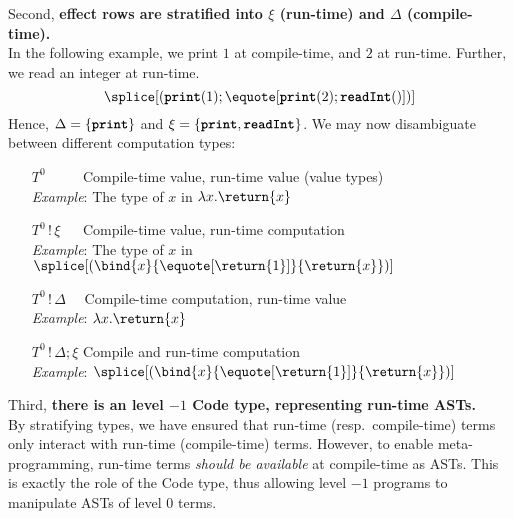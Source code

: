   Second, \textbf{effect rows are stratified into $\xi$ (run-time) and $\Delta$ (compile-time).}\\
  In the following example, we print $1$ at compile-time, and $2$ at run-time. Further, we read an integer at run-time.
\[\splice[{(\textbf{\texttt{print}}(1); \equote[\textbf{\texttt{print}}(2); \textbf{\texttt{readInt}}()])}]\]
Hence, $\Delta = \{ \textbf{\texttt{print}} \}$ and $\xi = \{ \textbf{\texttt{print}}, \textbf{\texttt{readInt}} \}$. We may now disambiguate between different computation types:
\begin{enumerate}[leftmargin=5.8\parindent]
  \item[$T^0 \quad\quad\,\,$] Compile-time value, run-time value (value types) \\
  \textit{Example}: The type of $x$ in $\lambda x. \return{x}$
  \item[$T^0 \, ! \, \xi \quad\;$] Compile-time value, run-time computation  \\
  \textit{Example}: The type of $x$ in $\splice[(\bind{x}{\equote[\return{1}]}{\return{x}})]$
  \item[$T^0 \, ! \, \Delta \quad$] Compile-time computation, run-time value \\
  \textit{Example}: $\lambda x. \return{x}$ 
  \item[$T^0 \, ! \, \Delta; \xi$] Compile and run-time computation \\
  \textit{Example}: $\splice[(\bind{x}{\equote[\return{1}]}{\return{x}})]$
\end{enumerate}

Third, \textbf{there is an level $-1$ \textsf{Code} type, representing run-time ASTs.}\\ 
  By stratifying types, we have ensured that run-time (resp.\ compile-time) terms only interact with run-time (compile-time) terms. However, to enable meta-programming, run-time terms \textit{should be available} at compile-time as ASTs. This is exactly the role of the \textsf{Code} type, thus allowing level $-1$ programs to manipulate ASTs of level $0$ terms.

